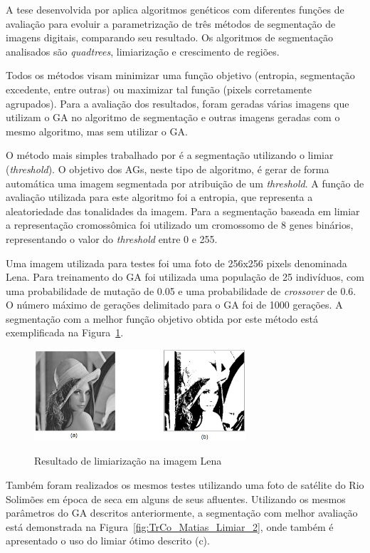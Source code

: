\documentclass[12pt,oneside,a4paper,english,french,spanish,brazil,]{abntex2}
\begin{document}
A tese desenvolvida por \citet{matias:2007} aplica algoritmos genéticos com diferentes funções de avaliação para evoluir a parametrização de três métodos de segmentação de imagens digitais, comparando seu resultado. Os algoritmos de segmentação analisados são \textit{quadtrees}, limiarização e crescimento de regiões.

Todos os métodos visam minimizar uma função objetivo (entropia, segmentação excedente, entre outras) ou maximizar tal função (pixels corretamente agrupados). Para a avaliação dos resultados, foram geradas várias imagens que utilizam o GA no algoritmo de segmentação e outras imagens geradas com o mesmo algoritmo, mas sem utilizar o GA. 

O método mais simples trabalhado por \citet{matias:2007} é a segmentação utilizando o limiar (\textit{threshold}). O objetivo dos AGs, neste tipo de algoritmo, é gerar de forma automática uma imagem segmentada por atribuição de um \textit{threshold}. A função de avaliação utilizada para este algoritmo foi a entropia, que representa a aleatoriedade das tonalidades da imagem. Para a segmentação baseada em limiar a representação cromossômica foi utilizado um cromossomo de 8 genes binários, representando o valor do \textit{threshold} entre 0 e 255. 

Uma imagem utilizada para testes foi uma foto de 256x256 pixels denominada Lena. Para treinamento do GA foi utilizada uma população de 25 indivíduos, com uma probabilidade de mutação de 0.05 e uma probabilidade de \textit{crossover} de 0.6. O número máximo de gerações delimitado para o GA foi de 1000 gerações. A segmentação com a melhor função objetivo obtida por este método está exemplificada na Figura~\ref{fig:TrCo_Matias_Limiar_1}.

\begin{figure}[ht]
\centering
\caption{Resultado de limiarização na imagem Lena}
\includegraphics[width=0.7\textwidth]{imagens/TrCo_Matias_Limiar_1.PNG}
\label{fig:TrCo_Matias_Limiar_1}
\end{figure}

Também foram realizados os mesmos testes utilizando uma foto de satélite do Rio Solimões em época de seca em alguns de seus afluentes. Utilizando os mesmos parâmetros do GA descritos anteriormente, a segmentação com melhor avaliação está demonstrada na Figura~\ref{fig:TrCo_Matias_Limiar_2}, onde também é apresentado o uso do limiar ótimo descrito \cite{gonzalez:2012} (c).
\end{document}
